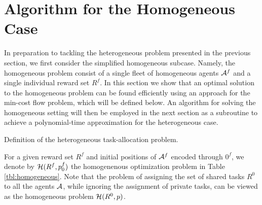 \documentclass[conference]{IEEEtran}
\begin{document}
\section{Algorithm for the Homogeneous Case}\label{sec:homogeneous}
In preparation to tackling the heterogeneous problem presented in the previous section, we first consider the simplified homogeneous subcase. Namely, the homogeneous problem consist of a single fleet of homogeneous agents $\mathcal{A}^f$ and a single individual reward set $R^f$. In this section we show that an optimal solution to the homogeneous problem can be found efficiently using an approach for the min-cost flow problem, which will be defined below. An algorithm for solving the homogeneous setting will then be employed in the next section as a subroutine to achieve a polynomial-time approximation for the heterogeneous case.

\begin{table}[!ht]
\label{tbl:homogeneous}
\noindent{}
\vspace{5pt}
\caption{Definition of the heterogeneous task-allocation problem.}
\end{table}

For a given reward set $R^f$ and initial positions of $\mathcal{A}^f$ encoded through $0^f$, we denote by  $\mathcal{H}(R^f, p_0^f)$ the homogenenous optimization problem in Table \ref{tbl:homogeneous}.%
Note that the problem of assigning the set of shared tasks $R^0$ to all the agents $\mathcal{A}$, while ignoring the assignment of private tasks, can be viewed as the homogeneous problem $\mathcal{H}(R^0,p)$.
 
\end{document}
